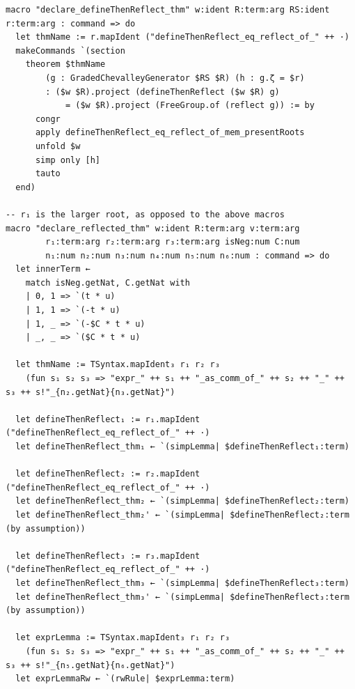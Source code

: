 \documentclass[10pt,a4paper]{article}
\begin{document}
\begin{Verbatim}
macro "declare_defineThenReflect_thm" w:ident R:term:arg RS:ident r:term:arg : command => do
  let thmName := r.mapIdent ("defineThenReflect_eq_reflect_of_" ++ ·)
  makeCommands `(section
    theorem $thmName
        (g : GradedChevalleyGenerator $RS $R) (h : g.ζ = $r)
        : ($w $R).project (defineThenReflect ($w $R) g)
            = ($w $R).project (FreeGroup.of (reflect g)) := by
      congr
      apply defineThenReflect_eq_reflect_of_mem_presentRoots
      unfold $w
      simp only [h]
      tauto
  end)

-- r₁ is the larger root, as opposed to the above macros
macro "declare_reflected_thm" w:ident R:term:arg v:term:arg
        r₁:term:arg r₂:term:arg r₃:term:arg isNeg:num C:num
        n₁:num n₂:num n₃:num n₄:num n₅:num n₆:num : command => do
  let innerTerm ←
    match isNeg.getNat, C.getNat with
    | 0, 1 => `(t * u)
    | 1, 1 => `(-t * u)
    | 1, _ => `(-$C * t * u)
    | _, _ => `($C * t * u)

  let thmName := TSyntax.mapIdent₃ r₁ r₂ r₃
    (fun s₁ s₂ s₃ => "expr_" ++ s₁ ++ "_as_comm_of_" ++ s₂ ++ "_" ++ s₃ ++ s!"_{n₂.getNat}{n₃.getNat}")

  let defineThenReflect₁ := r₁.mapIdent ("defineThenReflect_eq_reflect_of_" ++ ·)
  let defineThenReflect_thm₁ ← `(simpLemma| $defineThenReflect₁:term)

  let defineThenReflect₂ := r₂.mapIdent ("defineThenReflect_eq_reflect_of_" ++ ·)
  let defineThenReflect_thm₂ ← `(simpLemma| $defineThenReflect₂:term)
  let defineThenReflect_thm₂' ← `(simpLemma| $defineThenReflect₂:term (by assumption))

  let defineThenReflect₃ := r₃.mapIdent ("defineThenReflect_eq_reflect_of_" ++ ·)
  let defineThenReflect_thm₃ ← `(simpLemma| $defineThenReflect₃:term)
  let defineThenReflect_thm₃' ← `(simpLemma| $defineThenReflect₃:term (by assumption))

  let exprLemma := TSyntax.mapIdent₃ r₁ r₂ r₃
    (fun s₁ s₂ s₃ => "expr_" ++ s₁ ++ "_as_comm_of_" ++ s₂ ++ "_" ++ s₃ ++ s!"_{n₅.getNat}{n₆.getNat}")
  let exprLemmaRw ← `(rwRule| $exprLemma:term)


\end{Verbatim}
\end{document}
